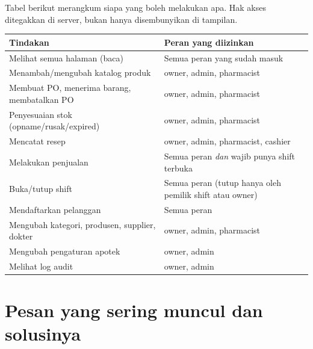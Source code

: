 \documentclass[11pt,a4paper]{article}
\begin{document}
Tabel berikut merangkum siapa yang boleh melakukan apa. Hak akses ditegakkan di
server, bukan hanya disembunyikan di tampilan.

\begin{longtable}{@{}L{5.4cm}L{9.4cm}@{}}
  \toprule
  \textbf{Tindakan} & \textbf{Peran yang diizinkan} \\
  \midrule
  \endhead
  Melihat semua halaman (baca) & Semua peran yang sudah masuk \\
  Menambah/mengubah katalog produk & owner, admin, pharmacist \\
  Membuat PO, menerima barang, membatalkan PO & owner, admin, pharmacist \\
  Penyesuaian stok (opname/rusak/expired) & owner, admin, pharmacist \\
  Mencatat resep & owner, admin, pharmacist, cashier \\
  Melakukan penjualan & Semua peran \emph{dan} wajib punya shift terbuka \\
  Buka/tutup shift & Semua peran (tutup hanya oleh pemilik shift atau owner) \\
  Mendaftarkan pelanggan & Semua peran \\
  Mengubah kategori, produsen, supplier, dokter & owner, admin, pharmacist \\
  Mengubah pengaturan apotek & owner, admin \\
  Melihat log audit & owner, admin \\
  \bottomrule
\end{longtable}

\section{Pesan yang sering muncul dan solusinya}
\end{document}
